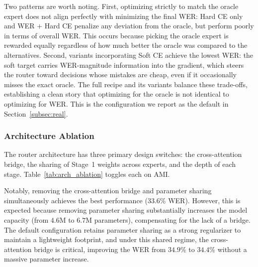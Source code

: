 \documentclass[journal]{IEEEtran}
\begin{document}
Two patterns are worth noting. First, optimizing strictly to match the oracle expert does not align perfectly with minimizing the final WER: Hard CE only and WER $+$ Hard CE penalize any deviation from the oracle, but perform poorly in terms of overall WER. This occurs because picking the oracle expert is rewarded equally regardless of how much better the oracle was compared to the alternatives. Second, variants incorporating Soft CE achieve the lowest WER: the soft target carries WER-magnitude information into the gradient, which steers the router toward decisions whose mistakes are cheap, even if it occasionally misses the exact oracle. The full recipe and its variants balance these trade-offs, establishing a clean story that optimizing for the oracle is not identical to optimizing for WER. This is the configuration we report as the default in Section~\ref{subsec:real}.


\subsubsection{Architecture Ablation}

The router architecture has three primary design switches: the
cross-attention bridge, the sharing of Stage~1 weights across
experts, and the depth of each stage. Table~\ref{tab:arch_ablation}
toggles each on AMI.

Notably, removing the cross-attention bridge and parameter sharing 
simultaneously achieves the best performance ($33.6\%$ WER). However, 
this is expected because removing parameter sharing substantially 
increases the model capacity (from $4.6$M to $6.7$M parameters), 
compensating for the lack of a bridge. The default configuration 
retains parameter sharing as a strong regularizer to maintain a 
lightweight footprint, and under this shared regime, the 
cross-attention bridge is critical, improving the WER from $34.9\%$ 
to $34.4\%$ without a massive parameter increase.
\end{document}
